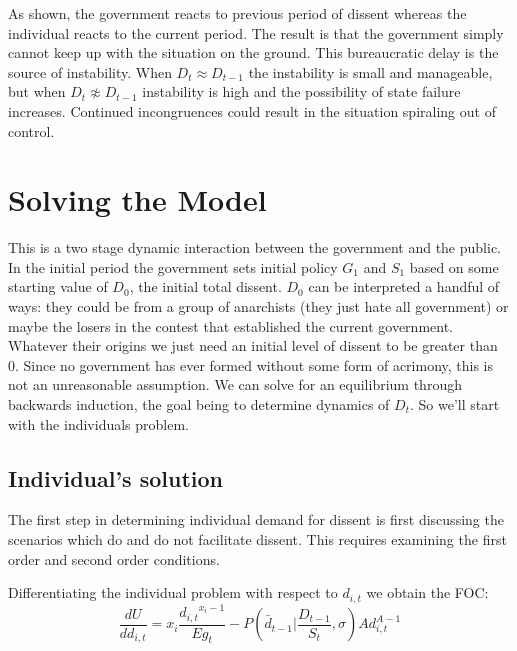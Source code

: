 \documentclass[12pt]{article}
\begin{document}
\begin{spacing}{1.5}
As shown, the government reacts to previous period of dissent whereas the individual reacts to the current period. The result is that the government simply cannot keep up with the situation on the ground. This bureaucratic delay is the source of instability. When $D_t \approx D_{t-1}$ the instability is small and manageable, but when $D_t \not\approx D_{t-1}$ instability is high and the possibility of state failure increases. Continued incongruences could result in the situation spiraling out of control. 

\section{Solving the Model}

This is a two stage dynamic interaction between the government and the public. In the initial period the government sets initial policy $G_1$ and $S_1$ based on some starting value of $D_0$, the initial total dissent. $D_0$ can be interpreted a handful of ways: they could be from a group of anarchists (they just hate all government) or maybe the losers in the contest that established the current government. Whatever their origins we just need an initial level of dissent to be greater than 0. Since no government has ever formed without some form of acrimony, this is not an unreasonable assumption. We can solve for an equilibrium through backwards induction, the goal being to determine dynamics of $D_t$. So we'll start with the individuals problem. 

\subsection{Individual's solution}


The first step in determining individual demand for dissent is first discussing the scenarios which do and do not facilitate dissent. This requires examining the first order and second order conditions.  

\noindent Differentiating the individual problem with respect to $d_{i,t}$ we obtain the FOC: 
\begin{equation}
\frac{dU}{dd_{i,t}} = x_i \frac{{d_{i,t}}^{x_i -1}}{E g_t} - P\left(\bar{d}_{t-1} \Big|\frac{D_{t-1}}{S_t},\sigma \right)Ad_{i,t}^{A-1}  
\end{equation}


\end{spacing}
\end{document}
